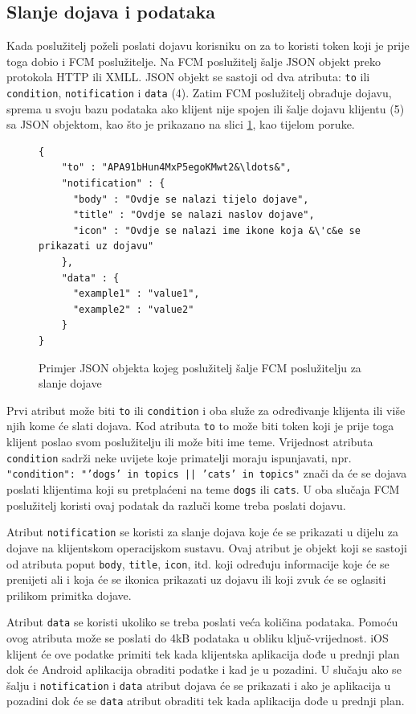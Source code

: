 \documentclass[times, utf8, zavrsni]{fer}
\begin{document}
{\subsection{Slanje dojava i podataka}
Kada poslužitelj poželi poslati dojavu korisniku on za to koristi token koji je prije toga dobio i FCM poslužitelje. Na FCM poslužitelj šalje JSON objekt preko protokola HTTP ili XMLL. JSON objekt se sastoji od dva atributa: {\tt to}  ili {\tt condition}, {\tt notification} i {\tt data} (4). Zatim FCM poslužitelj obrađuje dojavu, sprema u svoju bazu podataka ako klijent nije spojen ili šalje dojavu klijentu (5) sa JSON objektom, kao što je prikazano na slici \ref{lst:json-dojava}, kao tijelom poruke.

\begin{figure}
\begin{lstlisting}
{
    "to" : "APA91bHun4MxP5egoKMwt2&\ldots&",
    "notification" : {
      "body" : "Ovdje se nalazi tijelo dojave",
      "title" : "Ovdje se nalazi naslov dojave",
      "icon" : "Ovdje se nalazi ime ikone koja &\'c&e se prikazati uz dojavu"
    },
    "data" : {
      "example1" : "value1",
      "example2" : "value2"
    }
}
\end{lstlisting}
\caption{Primjer JSON objekta kojeg poslužitelj šalje FCM poslužitelju za slanje dojave}
\label{lst:json-dojava}
\end{figure}

Prvi atribut može biti {\tt to} ili {\tt condition} i oba služe za određivanje klijenta ili više njih kome će slati dojava. Kod atributa {\tt to} to može biti token koji je prije toga klijent poslao svom poslužitelju ili može biti ime teme. Vrijednost atributa {\tt condition} sadrži neke uvijete koje primatelji moraju ispunjavati, npr. {\tt "condition": "'dogs' in topics || 'cats' in topics"} znači da će se dojava poslati klijentima koji su pretplaćeni na teme {\tt dogs}  ili {\tt cats}. U oba slučaja FCM poslužitelj koristi ovaj podatak da razluči kome treba poslati dojavu.

Atribut {\tt notification} se koristi za slanje dojava koje će se prikazati u dijelu za dojave na klijentskom operacijskom sustavu. Ovaj atribut je objekt koji se sastoji od atributa poput {\tt body}, {\tt title}, {\tt icon}, itd. koji određuju informacije koje će se prenijeti ali i koja će se ikonica prikazati uz dojavu ili koji zvuk će se oglasiti prilikom primitka dojave.

Atribut {\tt data} se koristi ukoliko se treba poslati veća količina podataka. Pomoću ovog atributa može se poslati do 4kB podataka u obliku ključ-vrijednost. iOS klijent će ove podatke primiti tek kada klijentska aplikacija dođe u prednji plan dok će Android aplikacija obraditi podatke i kad je u pozadini. U slučaju ako se šalju i {\tt notification} i {\tt data} atribut dojava će se prikazati i ako je aplikacija u pozadini dok će se {\tt data} atribut obraditi tek kada aplikacija dođe u prednji plan.\citep{fcm2017}

}
\end{document}
